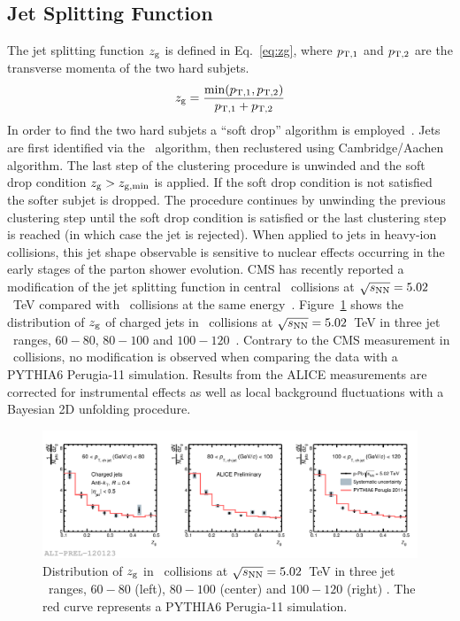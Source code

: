 \documentclass[10pt]{article}
\begin{document}
\subsection{Jet Splitting Function}
The jet splitting function $z_{\rm g}$ is defined in Eq.~\ref{eq:zg}, where $p_{\rm T,1}$ and $p_{\rm T,2}$ are the transverse momenta
of the two hard subjets.
\begin{equation}
z_{\rm g} = \frac{\min({p_{\rm T,1},p_{\rm T,2}})}{p_{\rm T,1}+p_{\rm T,2}}
\label{eq:zg}
\end{equation}
In order to find the two hard subjets a ``soft drop'' algorithm is employed~\cite{Larkoski:2014, Larkoski:2015}. Jets are first identified via the \antikt\ algorithm, then reclustered using Cambridge/Aachen algorithm.
The last step of the clustering procedure is unwinded and the soft drop condition $z_{\rm g} > z_{\rm g, min}$ is applied. If the soft drop condition is not satisfied the softer subjet is dropped.
The procedure continues by unwinding the previous clustering step until the soft drop condition is satisfied or the last clustering step is reached (in which case the jet is rejected).
When applied to jets in heavy-ion collisions, this jet shape observable is sensitive to nuclear effects occurring in the early stages of the parton shower evolution.
CMS has recently reported a modification of the jet splitting function in central \PbPb\ collisions at $\sqrt{s_{\rm NN}}=5.02$~TeV compared with
\pp\ collisions at the same energy~\cite{CMS:2017a}.
Figure~\ref{fig:zgppb} shows the distribution of $z_{\rm g}$ of charged jets in \pPb\ collisions at $\sqrt{s_{\rm NN}}=5.02$~TeV in three jet \pt\ ranges, $60-80$, $80-100$ and $100-120$~\GeVc. 
Contrary to the CMS measurement in \PbPb\ collisions, no modification is observed when comparing the data with a PYTHIA6 Perugia-11 simulation.
Results from the ALICE measurements are corrected for instrumental effects as well as local background fluctuations with a Bayesian 2D unfolding procedure.
\begin{figure}[tb]
\centering
\includegraphics[width=.85\textwidth]{img/2017-Feb-01-zg_unfolded_20GeV_ALL}
\caption{Distribution of $z_{\rm g}$ in \pPb\ collisions at $\sqrt{s_{\rm NN}}=5.02$~TeV in three jet \pt\ ranges, $60-80$ (left), $80-100$ (center) and $100-120$ (right) \GeVc.
The red curve represents a PYTHIA6 Perugia-11 simulation.}
\label{fig:zgppb}
\end{figure}
\end{document}
